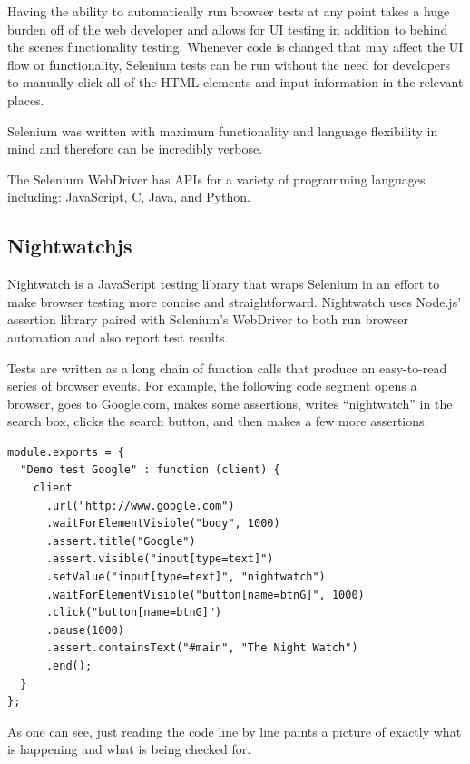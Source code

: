 \documentclass[12pt]{ucthesis}
\begin{document}
Having the ability to automatically run browser tests at any point takes a huge burden off of the web developer and allows for UI testing in addition to behind the scenes functionality testing. Whenever code is changed that may affect the UI flow or functionality, Selenium tests can be run without the need for developers to manually click all of the HTML elements and input information in the relevant places.


Selenium was written with maximum functionality and language flexibility in mind and therefore can be incredibly verbose.

The Selenium WebDriver has APIs for a variety of programming languages including: JavaScript, C, Java, and Python.

\subsection{Nightwatchjs}
Nightwatch\cite{NightwatchJS} is a JavaScript testing library that wraps Selenium in an effort to make browser testing more concise and straightforward. Nightwatch uses Node.js' assertion library paired with Selenium's WebDriver to both run browser automation and also report test results.

Tests are written as a long chain of function calls that produce an easy-to-read series of browser events. For example, the following code segment opens a browser, goes to Google.com, makes some assertions, writes ``nightwatch'' in the search box, clicks the search button, and then makes a few more assertions:
\begin{lstlisting}
module.exports = {
  "Demo test Google" : function (client) {
    client
      .url("http://www.google.com")
      .waitForElementVisible("body", 1000)
      .assert.title("Google")
      .assert.visible("input[type=text]")
      .setValue("input[type=text]", "nightwatch")
      .waitForElementVisible("button[name=btnG]", 1000)
      .click("button[name=btnG]")
      .pause(1000)
      .assert.containsText("#main", "The Night Watch")
      .end();
  }
};
\end{lstlisting}
As one can see, just reading the code line by line paints a picture of exactly what is happening and what is being checked for. 
\end{document}
